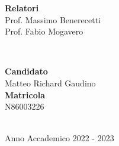 \documentclass[./main.tex]{subfiles}
\begin{document}
\begin{center}
\begin{minipage}[t]{0.55\textwidth}
\begin{flushleft} \large
\textbf{Relatori}\\
Prof. Massimo Benerecetti \\[5pt]
Prof. Fabio Mogavero \\[5pt]
\end{flushleft}
\end{minipage}
~
\begin{minipage}[t]{0.4\textwidth}
\begin{flushright} \large
\textbf{Candidato}\\
Matteo Richard Gaudino\\[5pt]
\textbf{Matricola}\\
N86003226\\
\end{flushright}
\end{minipage}\\[0cm]

\vfill
{\large Anno Accademico 2022 - 2023}
\end{center}

\restoregeometry %
\end{document}
